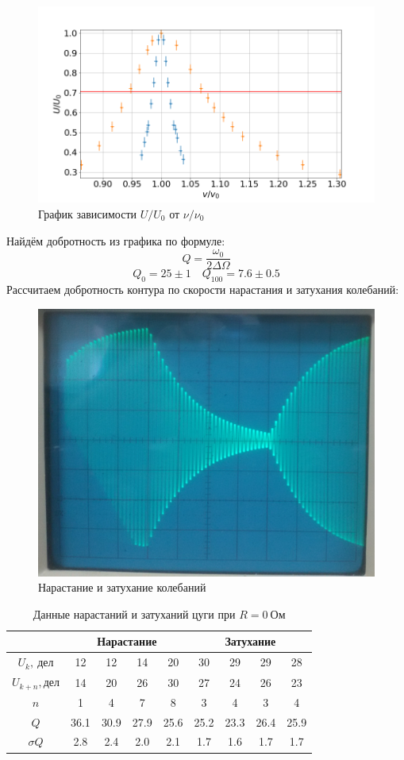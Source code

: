 \documentclass[a4paper, fontsize=14pt]{article}
\begin{document}
\begin{figure}[H]
	\includegraphics[width = 1.0\linewidth]{10.png}
\caption{График зависимости $U / U_0$ от $\nu / \nu_0$}
\end{figure}
Найдём добротность из графика по формуле:
\[
	Q = \frac{\omega_0}{2 \Delta \Omega}
\]
\[
	Q_0 = 25 \pm 1 \quad Q_{100} = 7.6 \pm 0.5 
\]
Рассчитаем добротность контура по скорости нарастания и затухания колебаний:
	\begin{figure}[H]
		\includegraphics[width = 0.88\linewidth]{zug.jpg}
	\caption{Нарастание и затухание колебаний}
	\end{figure}
	\begin{table}[H]
	\centering
	\begin{tabular}{|c|c|c|c|c|c|c|c|c|}  \hline
	{} & \multicolumn{4}{|c|}{Нарастание} & \multicolumn{4}{|c|}{Затухание} \\\hline
	$U_k,\ \text{дел}$ & 12 & 12 & 14 & 20 & 30 & 29 & 29 & 28 \\\hline
	$U_{k+n}, \text{дел}$ & 14 & 20 & 26 & 30 & 27 & 24 & 26 & 23 \\\hline
	$n$ & 1 & 4 & 7 & 8 & 3 & 4 & 3 & 4 \\\hline
	$Q$ & 36.1 & 30.9 & 27.9 & 25.6 & 25.2 & 23.3 & 26.4 & 25.9 \\\hline
	$\sigma Q$ & 2.8 & 2.4 & 2.0 & 2.1 & 1.7 & 1.6 & 1.7 & 1.7 \\\hline
	\end{tabular}
	\caption{Данные нарастаний и затуханий цуги при $R = 0\ \text{Ом}$}
	\end{table}
\end{document}
